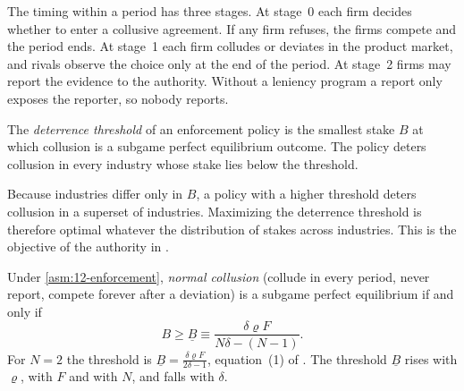 The timing within a period has three stages. At stage~0 each firm decides whether to enter a collusive agreement. If
any firm refuses, the firms compete and the period ends. At stage~1 each firm colludes or deviates in the product
market, and rivals observe the choice only at the end of the period. At stage~2 firms may report the evidence to the
authority. Without a leniency program a report only exposes the reporter, so nobody reports.

\begin{definition}\label{def:12-deterrence}
The \emph{deterrence threshold} of an enforcement policy is the smallest stake $B$ at which collusion is a subgame
perfect equilibrium outcome. The policy deters collusion in every industry whose stake lies below the threshold.
\end{definition}

Because industries differ only in $B$, a policy with a higher threshold deters collusion in a superset of
industries. Maximizing the deterrence threshold is therefore optimal whatever the distribution of stakes across
industries. This is the objective of the authority in \citet{ChenRey2013}.

\begin{proposition}\label{prop:12-fines}
Under \cref{asm:12-enforcement}, \emph{normal collusion} (collude in every period, never report, compete forever after
a deviation) is a subgame perfect equilibrium if and only if
\begin{equation}\label{eq:12-fines-threshold}
B \ge \underline B \equiv \frac{\delta\varrho F}{N\delta - (N-1)}.
\end{equation}
For $N = 2$ the threshold is $\underline B = \frac{\delta\varrho F}{2\delta - 1}$, equation~(1) of
\citet{ChenRey2013}. The threshold $\underline B$ rises with $\varrho$, with $F$ and with $N$, and falls with
$\delta$.
\end{proposition}

